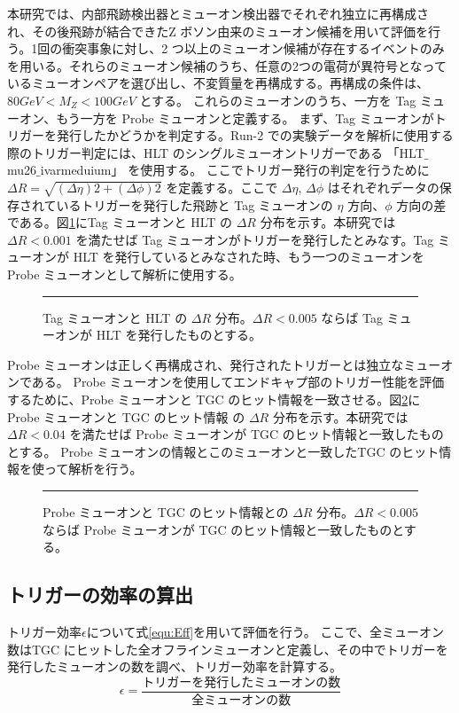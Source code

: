 本研究では、内部飛跡検出器とミューオン検出器でそれぞれ独立に再構成され、その後飛跡が結合できたZ ボソン由来のミューオン候補を用いて評価を行う。1回の衝突事象に対し、2 つ以上のミューオン候補が存在するイベントのみを用いる。それらのミューオン候補のうち、任意の2つの電荷が異符号となっているミューオンペアを選び出し、不変質量を再構成する。再構成の条件は、$80 GeV < M_Z < 100 GeV$ とする。
これらのミューオンのうち、一方を Tag ミューオン、もう一方を Probe ミューオンと定義する。
まず、Tag ミューオンがトリガーを発行したかどうかを判定する。Run-2 での実験データを解析に使用する際のトリガー判定には、HLT のシングルミューオントリガーである 「HLT$\_$mu26$\_$ivarmeduium」 を使用する。
ここでトリガー発行の判定を行うために $\Delta R = \sqrt{(\Delta \eta)2 + (\Delta \phi)2}$ を定義する。ここで $\Delta \eta$, $\Delta \phi$ はそれぞれデータの保存されているトリガーを発行した飛跡と Tag ミューオンの $\eta$ 方向、$\phi$ 方向の差である。図\ref{fig:tag_HLT}にTag ミューオンと HLT の $\Delta R$ 分布を示す。本研究では$\Delta R < 0.001$ を満たせば Tag ミューオンがトリガーを発行したとみなす。Tag ミューオンが HLT を発行しているとみなされた時、もう一つのミューオンを Probe ミューオンとして解析に使用する。

\begin{figure}[tb]
  \centering
  \rule{8cm}{6cm}
  \caption{Tag ミューオンと HLT の $\Delta R$ 分布。$\Delta R < 0.005$ ならば Tag ミューオンが HLT を発行したものとする。}
  \label{fig:tag_HLT}
\end{figure}

Probe ミューオンは正しく再構成され、発行されたトリガーとは独立なミューオンである。
Probe ミューオンを使用してエンドキャプ部のトリガー性能を評価するために、Probe ミューオンと TGC のヒット情報を一致させる。図\ref{fig:Probe_TGC}に Probe ミューオンと TGC のヒット情報 の $\Delta R$ 分布を示す。本研究では$\Delta R < 0.04$ を満たせば Probe ミューオンが TGC のヒット情報と一致したものとする。
Probe ミューオンの情報とこのミューオンと一致したTGC のヒット情報を使って解析を行う。

\begin{figure}[tb]
  \centering
  \rule{8cm}{6cm}
  \caption{Probe ミューオンと TGC のヒット情報との $\Delta R$ 分布。$\Delta R < 0.005$ ならば Probe ミューオンが TGC のヒット情報と一致したものとする。}
  \label{fig:Probe_TGC}
\end{figure}


\subsection{トリガーの効率の算出}
トリガー効率$\epsilon$について式\ref{equ:Eff}を用いて評価を行う。
ここで、全ミューオン数はTGC にヒットした全オフラインミューオンと定義し、その中でトリガーを発行したミューオンの数を調べ、トリガー効率を計算する。
\begin{equation}
　\epsilon=\frac{トリガーを発行したミューオンの数}{全ミューオンの数}
　\label{equ:Eff}
\end{equation}


